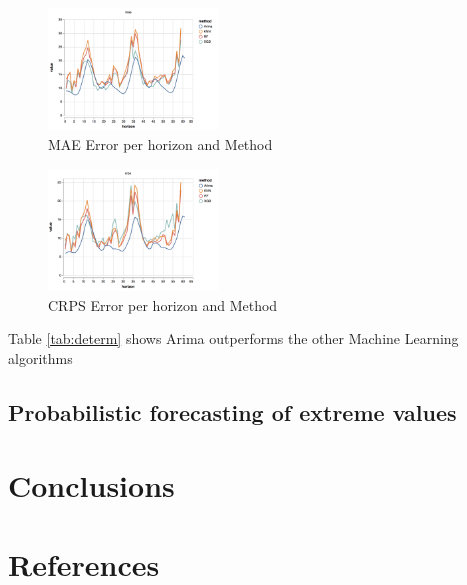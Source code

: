 \documentclass[a4paper,twocolumn,5p]{elsarticle}
\begin{document}
\begin{figure}
  \caption{MAE Error per horizon and Method}
  \centering
      \includegraphics[width=0.4\textwidth]{results/mae}
\end{figure}

\begin{figure}
  \caption{CRPS Error per horizon and Method}
  \centering
      \includegraphics[width=0.4\textwidth]{results/crps}
\end{figure}

Table \ref{tab:determ} shows Arima outperforms the other Machine Learning algorithms

\subsection{Probabilistic forecasting of extreme values}
\label{sec:probabilistic}

\cite{qxgb}

\section{Conclusions}
\label{sec:concl}

\section*{References}


\end{document}
